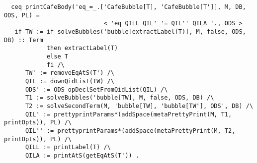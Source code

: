 {\codesize
\begin{verbatim}
  ceq printCafeBody('eq_=_.['CafeBubble[T], 'CafeBubble[T']], M, DB, ODS, PL) =
                            < 'eq QILL QIL' '= QIL'' QILA '., ODS >
   if TW := if solveBubbles('bubble[extractLabel(T)], M, false, ODS, DB) :: Term
            then extractLabel(T)
            else T
            fi /\
      TW' := removeEqAtS(T') /\
      QIL := downQidList(TW) /\
      ODS' := ODS opDeclSetFromQidList(QIL) /\
      T1 := solveBubbles('bubble[TW], M, false, ODS, DB) /\
      T2 := solveSecondTerm(M, 'bubble[TW], 'bubble[TW'], ODS', DB) /\
      QIL' := prettyprintParams*(addSpace(metaPrettyPrint(M, T1, printOpts)), PL) /\
      QIL'' := prettyprintParams*(addSpace(metaPrettyPrint(M, T2, printOpts)), PL) /\
      QILL := printLabel(T) /\
      QILA := printAtS(getEqAtS(T')) .
\end{verbatim}
}

